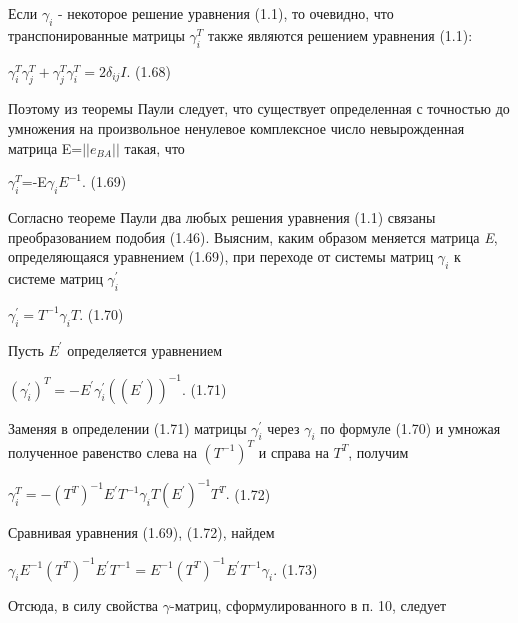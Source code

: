 \documentclass{article}
\begin{document}
{Если $\gamma_i$ - некоторое решение уравнения (1.1), то очевидно, что транспонированные матрицы $\gamma^{T}_i$ также являются решением уравнения (1.1):\par
\begin{center}
$\gamma^{T}_i\gamma^{T}_j+\gamma^{T}_j\gamma^{T}_i=2\delta_{ij}I$.        (1.68)\par
\end{center}
Поэтому из теоремы Паули следует, что существует определенная с точностью до умножения на произвольное ненулевое комплексное число невырожденная матрица E=$||e_{BA}||$ такая, что \par
\begin{center}
$\gamma^{T}_i$=-E$\gamma_i E^{-1}.$        (1.69)\par
\end{center}
Согласно теореме Паули два любых решения уравнения (1.1) связаны преобразованием подобия (1.46). Выясним, каким образом меняется матрица \textsl{E}, определяющаяся уравнением (1.69), при переходе от системы матриц $\gamma_i$ к системе матриц $\gamma_i^{'}$\par
\begin{center}
$\gamma_i^{'}=T^{-1}\gamma_i T$.        (1.70) \par
\end{center}
Пусть \textsl{$E^{'}$} определяется уравнением \par
\begin{center}
$(\gamma_i^{'})^{T}=-E^{'}\gamma_i^{'}((E^{'}))^{-1}.$       (1.71)\par
\end{center}
Заменяя в определении (1.71) матрицы $\gamma^{'}_i$ через $\gamma_i$ по формуле (1.70) и умножая полученное равенство слева на $(T^{-1})^{T}$ и справа на $T^{T}$, получим\par
\begin{center}
$\gamma^{T}_i=-(T^{T})^{-1}E^{'}T^{-1}\gamma_i T(E^{'})^{-1}T^{T}.$       (1.72)\par
\end{center}
Сравнивая уравнения (1.69), (1.72), найдем \par
\begin{center}
$\gamma_i E^{-1}(T^{T})^{-1}E^{'}T^{-1}=E^{-1}(T^{T})^{-1}E^{'}T^{-1}\gamma_i.$ (1.73)\par
\end{center}
Отсюда, в силу свойства $\gamma$-матриц, сформулированного в п. 10, следует\par
\begin{center}

\end{center}}
\end{document}
